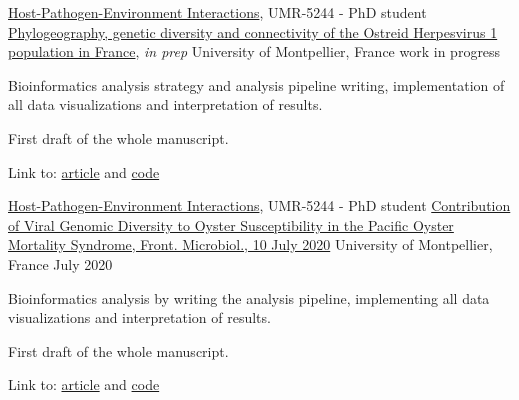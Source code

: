 

\begin{cventries}

  \cventry
    {\href{http://ihpe.univ-perp.fr/}{Host-Pathogen-Environment Interactions}, UMR-5244 - PhD student} %
    {\href{}{Phylogeography, genetic diversity and connectivity of the Ostreid Herpesvirus 1 population in France}, \textit{in prep}} %
    {University of Montpellier, France} %
    {work in progress} %
    {
      \begin{cvitems} %
        \item {Bioinformatics analysis strategy and analysis pipeline writing, implementation of all data visualizations and interpretation of results.}
        \item {First draft of the whole manuscript.}
        \item Link to: {\href{DOI}{article} and \href{https://github.com/propan2one/OshV-1-molepidemio}{code}}
      \end{cvitems}
    }

  \cventry
    {\href{http://ihpe.univ-perp.fr/}{Host-Pathogen-Environment Interactions}, UMR-5244 - PhD student} %
    {\href{https://doi.org/10.3389/fmicb.2020.01579}{Contribution of Viral Genomic Diversity to Oyster Susceptibility in the Pacific Oyster Mortality Syndrome, Front. Microbiol., 10 July 2020}} %
    {University of Montpellier, France} %
    {July 2020} %
    {
      \begin{cvitems} %
        \item {Bioinformatics analysis by writing the analysis pipeline, implementing all data visualizations and interpretation of results.}
        \item {First draft of the whole manuscript.}
        \item Link to: {\href{https://doi.org/10.3389/fmicb.2020.01579}{article} and \href{https://github.com/IHPE/DivOsHV}{code}}
      \end{cvitems}
    }


\end{cventries}
